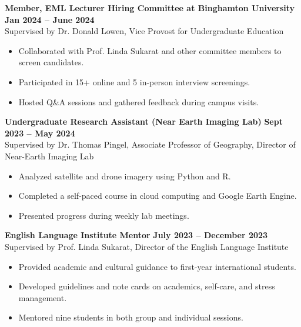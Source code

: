 \documentclass[11pt]{article}
\begin{document}
\noindent
\textbf{Member, EML Lecturer Hiring Committee at Binghamton University} \hfill \textbf{Jan 2024 -- June 2024} \\
Supervised by Dr. Donald Lowen, Vice Provost for Undergraduate Education \\
\begin{itemize}[leftmargin=*]
    \item Collaborated with Prof. Linda Sukarat and other committee members to screen candidates.
    \item Participated in 15+ online and 5 in-person interview screenings.
    \item Hosted Q\&A sessions and gathered feedback during campus visits.
\end{itemize}

\noindent
\textbf{Undergraduate Research Assistant (Near Earth Imaging Lab)} \hfill \textbf{Sept 2023 -- May 2024} \\
Supervised by Dr. Thomas Pingel, Associate Professor of Geography, Director of Near-Earth Imaging Lab
\begin{itemize}[leftmargin=*]
    \item Analyzed satellite and drone imagery using Python and R.
    \item Completed a self-paced course in cloud computing and Google Earth Engine.
    \item Presented progress during weekly lab meetings.
\end{itemize}

\noindent
\textbf{English Language Institute Mentor} \hfill \textbf{July 2023 -- December 2023} \\
Supervised by Prof. Linda Sukarat, Director of the English Language Institute
\begin{itemize}[leftmargin=*]
    \item Provided academic and cultural guidance to first-year international students.
    \item Developed guidelines and note cards on academics, self-care, and stress management.
    \item Mentored nine students in both group and individual sessions.
\end{itemize}
\end{document}
